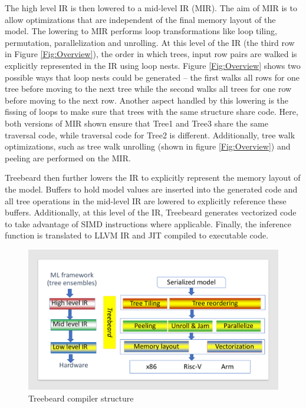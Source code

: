 The high level IR is then lowered to a mid-level IR (MIR). The aim of MIR is 
to allow optimizations that are independent of the final memory layout of the model. 
The lowering to MIR performs loop transformations like loop tiling, permutation, parallelization and unrolling.
At this level of the IR (the third row in Figure \ref{Fig:Overview}),
the order in which trees, input row pairs are walked is explicitly represented in the IR using loop nests.
Figure \ref{Fig:Overview} shows two possible ways that loop nests could be generated -- the first
walks all rows for one tree before moving to the next tree while the second walks all trees for 
one row before moving to the next row. Another aspect handled by this lowering is the fissing of 
loops to make sure that trees with the same structure share code. Here, both versions of MIR shown 
ensure that Tree1 and Tree3 share the same traversal code, while traversal code for Tree2 is different.
Additionally, tree walk optimizations, such as tree walk unrolling (shown in figure \ref{Fig:Overview}) and 
peeling are performed on the MIR.

Treebeard then further lowers the IR to explicitly represent the memory layout of the model. Buffers to hold model 
values are inserted into the generated code and all tree operations in the mid-level IR are lowered to explicitly 
reference these buffers. Additionally, at this level of the IR, Treebeard generates vectorized code to take 
advantage of SIMD instructions where applicable. Finally, the inference function is translated to LLVM IR and 
JIT compiled to executable code. 


\begin{figure}
  \centering
  \includegraphics[width=\linewidth]{figures/compiler.pdf}
  \caption{Treebeard compiler structure}
  \label{Fig:CompilerStructure}
\end{figure}

